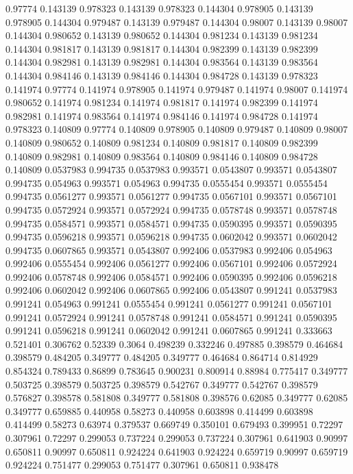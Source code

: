 0.97774 0.143139
0.978323 0.143139
0.978323 0.144304
0.978905 0.143139
0.978905 0.144304
0.979487 0.143139
0.979487 0.144304
0.98007 0.143139
0.98007 0.144304
0.980652 0.143139
0.980652 0.144304
0.981234 0.143139
0.981234 0.144304
0.981817 0.143139
0.981817 0.144304
0.982399 0.143139
0.982399 0.144304
0.982981 0.143139
0.982981 0.144304
0.983564 0.143139
0.983564 0.144304
0.984146 0.143139
0.984146 0.144304
0.984728 0.143139
0.978323 0.141974
0.97774 0.141974
0.978905 0.141974
0.979487 0.141974
0.98007 0.141974
0.980652 0.141974
0.981234 0.141974
0.981817 0.141974
0.982399 0.141974
0.982981 0.141974
0.983564 0.141974
0.984146 0.141974
0.984728 0.141974
0.978323 0.140809
0.97774 0.140809
0.978905 0.140809
0.979487 0.140809
0.98007 0.140809
0.980652 0.140809
0.981234 0.140809
0.981817 0.140809
0.982399 0.140809
0.982981 0.140809
0.983564 0.140809
0.984146 0.140809
0.984728 0.140809
0.0537983 0.994735
0.0537983 0.993571
0.0543807 0.993571
0.0543807 0.994735
0.054963 0.993571
0.054963 0.994735
0.0555454 0.993571
0.0555454 0.994735
0.0561277 0.993571
0.0561277 0.994735
0.0567101 0.993571
0.0567101 0.994735
0.0572924 0.993571
0.0572924 0.994735
0.0578748 0.993571
0.0578748 0.994735
0.0584571 0.993571
0.0584571 0.994735
0.0590395 0.993571
0.0590395 0.994735
0.0596218 0.993571
0.0596218 0.994735
0.0602042 0.993571
0.0602042 0.994735
0.0607865 0.993571
0.0543807 0.992406
0.0537983 0.992406
0.054963 0.992406
0.0555454 0.992406
0.0561277 0.992406
0.0567101 0.992406
0.0572924 0.992406
0.0578748 0.992406
0.0584571 0.992406
0.0590395 0.992406
0.0596218 0.992406
0.0602042 0.992406
0.0607865 0.992406
0.0543807 0.991241
0.0537983 0.991241
0.054963 0.991241
0.0555454 0.991241
0.0561277 0.991241
0.0567101 0.991241
0.0572924 0.991241
0.0578748 0.991241
0.0584571 0.991241
0.0590395 0.991241
0.0596218 0.991241
0.0602042 0.991241
0.0607865 0.991241
0.333663 0.521401
0.306762 0.52339
0.3064 0.498239
0.332246 0.497885
0.398579 0.464684
0.398579 0.484205
0.349777 0.484205
0.349777 0.464684
0.864714 0.814929
0.854324 0.789433
0.86899 0.783645
0.900231 0.800914
0.88984 0.775417
0.349777 0.503725
0.398579 0.503725
0.398579 0.542767
0.349777 0.542767
0.398579 0.576827
0.398578 0.581808
0.349777 0.581808
0.398576 0.62085
0.349777 0.62085
0.349777 0.659885
0.440958 0.58273
0.440958 0.603898
0.414499 0.603898
0.414499 0.58273
0.63974 0.379537
0.669749 0.350101
0.679493 0.399951
0.72297 0.307961
0.72297 0.299053
0.737224 0.299053
0.737224 0.307961
0.641903 0.90997
0.650811 0.90997
0.650811 0.924224
0.641903 0.924224
0.659719 0.90997
0.659719 0.924224
0.751477 0.299053
0.751477 0.307961
0.650811 0.938478
